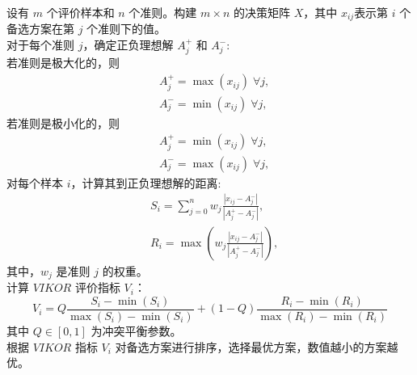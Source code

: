 \documentclass{article}
\begin{document}
设有 $m$ 个评价样本和 $n$ 个准则。构建 $m \times n$ 的决策矩阵 $X$，其中 $x_{ij}$​ 表示第 $i$ 个备选方案在第 $j$ 个准则下的值。\\
对于每个准则 $j$，确定正负理想解 $A^{+}_{j}$ 和 $A^{-}_{j}$: \\
若准则是极大化的，则
\[
\begin{aligned}
& A^{+}_{j} = \max{(x_{ij})} \; \forall j, \\
& A^{-}_{j} = \min{(x_{ij})} \; \forall j,
\end{aligned}
\]
若准则是极小化的，则
\[
\begin{aligned}
& A^{+}_{j} = \min{(x_{ij})} \; \forall j, \\
& A^{-}_{j} = \max{(x_{ij})} \; \forall j,
\end{aligned}
\]
对每个样本 $i$，计算其到正负理想解的距离:
\[
\begin{aligned}
& S_i = \sum\limits_{j = 0}^{n} w_{j} \frac{|x_{ij} - A^{-}_{j}|}{|A^{+}_{j} - A^{-}_{j}|}, \\
& R_i = \max{(w_{j} \frac{|x_{ij} - A^{-}_{j}|}{|A^{+}_{j} - A^{-}_{j}|})},
\end{aligned}
\]
其中，$w_j$ 是准则 $j$ 的权重。\\
计算 $VIKOR$ 评价指标 $V_i$：
\[
V_i = Q \frac{S_i - \min{(S_i)}}{\max{(S_i)} - \min{(S_i)}} + (1 - Q) \frac{R_i - \min{(R_i)}}{\max{(R_i)} - \min{(R_i)}}
\]
其中 $Q \in [0, 1]$ 为冲突平衡参数。\\
根据 $VIKOR$ 指标 $V_i$ 对备选方案进行排序，选择最优方案，数值越小的方案越优。
\end{document}
